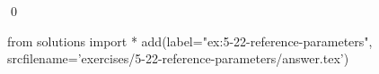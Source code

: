
\begin{ex}
  \label{ex:5-22-reference-parameters}
  
  \qed
\end{ex}
\begin{python0}
from solutions import *
add(label="ex:5-22-reference-parameters",
    srcfilename='exercises/5-22-reference-parameters/answer.tex')
\end{python0}
